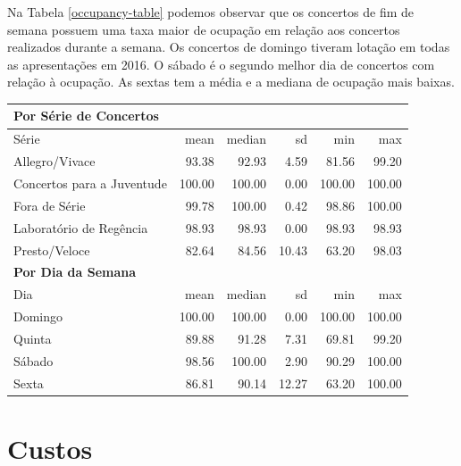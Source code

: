 \documentclass[a4paper, 12pt, openright, oneside, german, french, english, brazil]{abntex2}
\begin{document}
	
	
	Na Tabela \ref{occupancy-table} podemos observar que os concertos de fim de semana possuem uma taxa maior de ocupação em relação aos concertos realizados durante a semana. Os concertos de domingo tiveram lotação em todas as apresentações em 2016. O sábado é o segundo melhor dia de concertos com relação à ocupação. As sextas tem a média e a mediana de ocupação mais baixas.
	
	\begin{table}[!h]
		{\begin{tabular}{lrrrrr}
				\hline
				\multicolumn{6}{l}{\textbf{Por Série de Concertos}} \\
				\hline
				Série & mean & median & sd & min & max \\ 
				\hline
				Allegro/Vivace & 93.38 & 92.93 & 4.59 & 81.56 & 99.20 \\ 
				Concertos para a Juventude & 100.00 & 100.00 & 0.00 & 100.00 & 100.00 \\ 
				Fora de Série & 99.78 & 100.00 & 0.42 & 98.86 & 100.00 \\
				Laboratório de Regência & 98.93 & 98.93 & 0.00 & 98.93 & 98.93 \\ 
				Presto/Veloce & 82.64 & 84.56 & 10.43 & 63.20 & 98.03 \\ 
				\hline
				\multicolumn{6}{l}{\textbf{Por Dia da Semana}} \\
				\hline
				Dia  & mean & median & sd & min & max \\
				\hline
				Domingo  & 100.00 & 100.00 & 0.00 & 100.00 & 100.00 \\ 
				Quinta & 89.88 & 91.28 & 7.31 & 69.81 & 99.20 \\ 
				Sábado & 98.56 & 100.00 & 2.90 & 90.29 & 100.00 \\  
				Sexta & 86.81 & 90.14 & 12.27 & 63.20 & 100.00 \\ 
				\hline
			\end{tabular}
		}
		{}
	\end{table}
	
	
	
	\section{Custos}
	
\end{document}
